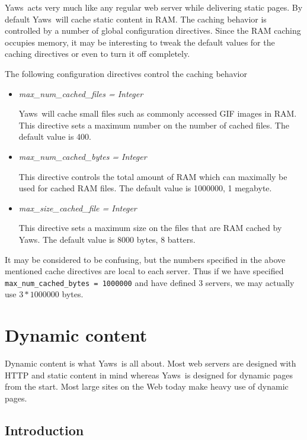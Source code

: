 \documentclass[11pt,oneside,english]{book}
\newcommand{\Yaws}            %
        {{\sc Yaws}}
\begin{document}
\Yaws\  acts very much like any regular web server while delivering
static pages. By default \Yaws\  will cache static content in RAM.
The caching behavior is controlled by a number of global
configuration directives. Since the RAM caching occupies memory,
it may be interesting to tweak the default values for the caching directives
or even to turn it off completely.

The following configuration directives control the caching behavior
\begin{itemize}
\item \textit{max\_num\_cached\_files = Integer}

\Yaws\   will  cache  small  files  such  as  commonly
              accessed  GIF images in RAM.  This directive sets a
              maximum number on the number of cached files.   The
              default value is 400.

\item\textit{max\_num\_cached\_bytes = Integer}

 This  directive  controls  the  total amount of RAM
             which can maximally be used for cached  RAM  files.
              The default value is 1000000, 1 megabyte.


\item\textit{max\_size\_cached\_file = Integer}

 This  directive  sets  a  maximum size on the files
              that are RAM cached by \Yaws{}.  The default value is
              8000 bytes, 8 batters.



\end{itemize}

It may be considered to be confusing, but the numbers specified
in the above mentioned cache directives are local to each
server. Thus if we have specified \verb+max_num_cached_bytes = 1000000+
and have defined 3 servers, we may actually use $3 * 1000000$ bytes.




\chapter{Dynamic content}

Dynamic content is what \Yaws\ is all about. Most web servers are
designed with HTTP and static content in mind whereas \Yaws\ is
designed for dynamic pages from the start.  Most large sites on the
Web today make heavy use of dynamic pages.


\section{Introduction}
\end{document}

